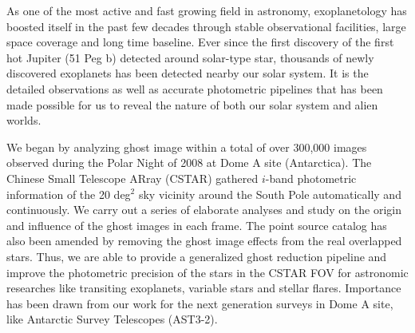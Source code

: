

\begin{englishabstract}

As one of the most active and fast growing field in astronomy, exoplanetology has boosted itself in the 
past few decades through stable observational facilities, large space coverage and long time baseline. 
Ever since the first discovery of the first hot Jupiter (51 Peg b) detected around solar-type star, thousands 
of newly discovered exoplanets has been detected nearby our solar system. It is the detailed observations 
as well as accurate photometric pipelines that has been made possible for us to reveal the nature of both our 
solar system and alien worlds.

We began by analyzing ghost image within a total of over 300,000 images observed during the Polar Night of 
2008 at Dome A site (Antarctica). The Chinese Small Telescope ARray (CSTAR) gathered $i$-band photometric 
information of the 20 deg$^2$ sky vicinity around the South Pole automatically and continuously. We carry out 
a series of elaborate analyses and study on the origin and influence of the ghost images in each frame. The 
point source catalog has also been amended by removing the ghost image effects from the real overlapped 
stars. Thus, we are able to provide a generalized ghost reduction pipeline and improve the photometric 
precision of the stars in the CSTAR FOV for astronomic researches like transiting exoplanets, variable stars 
and stellar flares. Importance has been drawn from our work for the next generation surveys in Dome A site, 
like Antarctic Survey Telescopes (AST3-2).  


\end{englishabstract}
